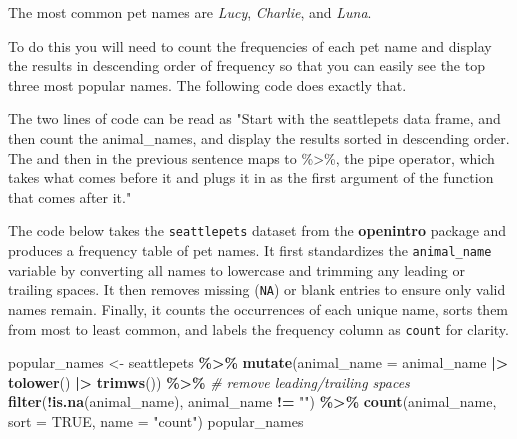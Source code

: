 \documentclass[
]{article}
\newenvironment{Shaded}{\begin{snugshade}}{\end{snugshade}}
\newcommand{\AttributeTok}[1]{\textcolor[rgb]{0.13,0.29,0.53}{#1}}
\newcommand{\CommentTok}[1]{\textcolor[rgb]{0.56,0.35,0.01}{\textit{#1}}}
\newcommand{\ConstantTok}[1]{\textcolor[rgb]{0.56,0.35,0.01}{#1}}
\newcommand{\FunctionTok}[1]{\textcolor[rgb]{0.13,0.29,0.53}{\textbf{#1}}}
\newcommand{\NormalTok}[1]{#1}
\newcommand{\OtherTok}[1]{\textcolor[rgb]{0.56,0.35,0.01}{#1}}
\newcommand{\SpecialCharTok}[1]{\textcolor[rgb]{0.81,0.36,0.00}{\textbf{#1}}}
\newcommand{\StringTok}[1]{\textcolor[rgb]{0.31,0.60,0.02}{#1}}
\begin{document}
The most common pet names are \emph{Lucy}, \emph{Charlie}, and
\emph{Luna}.

To do this you will need to count the frequencies of each pet name and
display the results in descending order of frequency so that you can
easily see the top three most popular names. The following code does
exactly that.

\begin{Shaded}
\begin{Highlighting}[]
\NormalTok{The two lines of code can be read as "Start with the seattlepets data frame, and then count the animal\_names, and display the results sorted in descending order. The \textquotesingle{}and then\textquotesingle{} in the previous sentence maps to \%\textgreater{}\%, the pipe operator, which takes what comes before it and plugs it in as the first argument of the function that comes after it."}
\end{Highlighting}
\end{Shaded}

The code below takes the \texttt{seattlepets} dataset from the
\textbf{openintro} package and produces a frequency table of pet names.
It first standardizes the \texttt{animal\_name} variable by converting
all names to lowercase and trimming any leading or trailing spaces. It
then removes missing (\texttt{NA}) or blank entries to ensure only valid
names remain. Finally, it counts the occurrences of each unique name,
sorts them from most to least common, and labels the frequency column as
\texttt{count} for clarity.

\begin{Shaded}
\begin{Highlighting}[]
\NormalTok{popular\_names }\OtherTok{\textless{}{-}}\NormalTok{ seattlepets }\SpecialCharTok{\%\textgreater{}\%}
  \FunctionTok{mutate}\NormalTok{(}\AttributeTok{animal\_name =}\NormalTok{ animal\_name }\SpecialCharTok{|\textgreater{}}
    \FunctionTok{tolower}\NormalTok{() }\SpecialCharTok{|\textgreater{}}
    \FunctionTok{trimws}\NormalTok{()) }\SpecialCharTok{\%\textgreater{}\%} \CommentTok{\# remove leading/trailing spaces}
  \FunctionTok{filter}\NormalTok{(}\SpecialCharTok{!}\FunctionTok{is.na}\NormalTok{(animal\_name), animal\_name }\SpecialCharTok{!=} \StringTok{""}\NormalTok{) }\SpecialCharTok{\%\textgreater{}\%}
  \FunctionTok{count}\NormalTok{(animal\_name, }\AttributeTok{sort =} \ConstantTok{TRUE}\NormalTok{, }\AttributeTok{name =} \StringTok{"count"}\NormalTok{)}
\NormalTok{popular\_names}
\end{Highlighting}
\end{Shaded}
\end{document}
